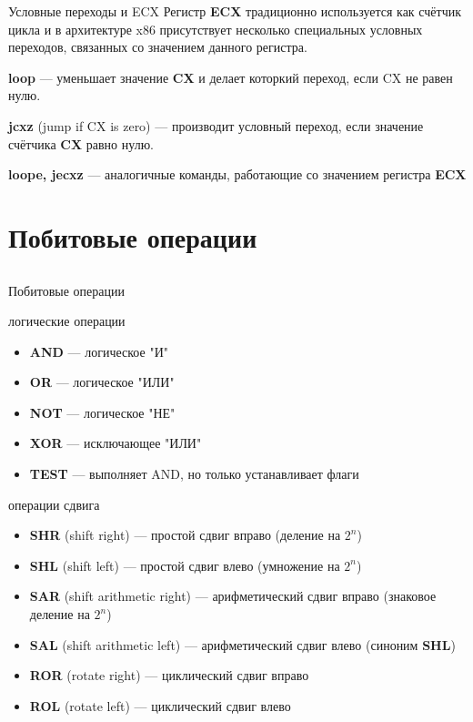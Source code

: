 \documentclass[utf8, russian]{beamer}
\begin{document}
    \begin{frame}{Условные переходы и ECX}
        Регистр {\bf ECX} традиционно используется как счётчик цикла и в архитектуре x86 присутствует несколько специальных условных переходов, связанных со значением данного регистра.

        \bigskip
        {\bf loop} --- уменьшает значение {\bf CX} и делает которкий переход, если CX не равен нулю.

        \bigskip
        {\bf jcxz} (jump if CX is zero) --- производит условный переход, если значение счётчика {\bf CX} равно нулю.

        \bigskip
        {\bf loope, jecxz} --- аналогичные команды, работающие со значением регистра {\bf ECX}
    \end{frame}
    \section{Побитовые операции}
    \subsection{}
    \begin{frame}{Побитовые операции}\footnotesize
        \begin{block}{логические операции}
            \begin{itemize}
                \item {\bf AND} --- логическое "И"
                \item {\bf OR} --- логическое "ИЛИ"
                \item {\bf NOT} --- логическое "НЕ"
                \item {\bf XOR} --- исключающее "ИЛИ"
                \item {\bf TEST} --- выполняет AND, но только устанавливает флаги
            \end{itemize}
        \end{block}
        \begin{block}{операции сдвига}
            \begin{itemize}
                \item {\bf SHR} (shift right) --- простой сдвиг вправо (деление на $2^n$)
                \item {\bf SHL} (shift left) --- простой сдвиг влево (умножение на $2^n$)
                \item {\bf SAR} (shift arithmetic right) --- арифметический сдвиг вправо (знаковое деление на $2^n$)
                \item {\bf SAL} (shift arithmetic left) --- арифметический сдвиг влево (синоним {\bf SHL})
                \item {\bf ROR} (rotate right) --- циклический сдвиг вправо
                \item {\bf ROL} (rotate left) --- циклический сдвиг влево
            \end{itemize}
        \end{block}
    \end{frame}
\end{document}

